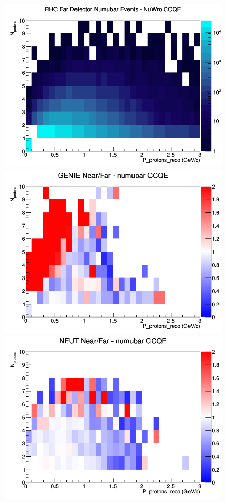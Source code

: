 \begin{figure}[h]
\endminipage
{}
\includegraphics[width=\linewidth]{eff_N_P/GAr/protons/CCQE_RHC_FD_numubar_N_P_NuWro.png}
\endminipage
\newline
{}
\includegraphics[width=\linewidth]{eff_N_P/GAr/protons/ratios/CCQE_GENIE_numubar_NF_N_P.png}
\endminipage
{}
\includegraphics[width=\linewidth]{eff_N_P/GAr/protons/ratios/CCQE_NEUT_numubar_NF_N_P.png}

\end{figure}
